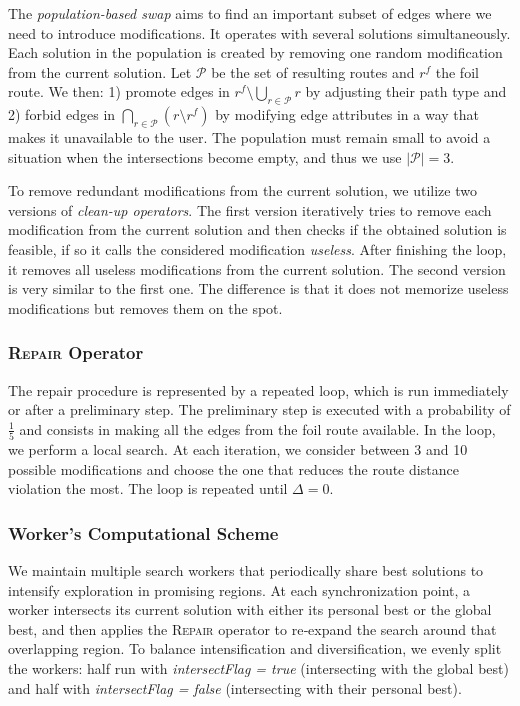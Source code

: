 \documentclass{article}
\begin{document}
The \textit{population-based swap} aims to find an important subset of edges where we need to introduce modifications. 
It operates with several solutions simultaneously. 
Each solution in the population is created by removing one random modification from the current solution. 
Let $\mathcal{P}$ be the set of resulting routes and $r^f$ the foil route. 
We then: 1) promote edges in
$
    r^f \setminus \bigcup_{r \in \mathcal{P}} r
$
by adjusting their path type and 2) forbid edges in 
$
    \bigcap_{r \in \mathcal{P}} \left(r \setminus r^f\right)
$
by modifying edge attributes in a way that makes it unavailable to the user. 
The population must remain small to avoid a situation when the intersections become empty, and thus we use $|\mathcal{P}| = 3$.

To remove redundant modifications from the current solution, we utilize two versions of \textit{clean-up operators}. 
The first version iteratively tries to remove each modification from the current solution and then checks if the obtained solution is feasible, if so it calls the considered modification \textit{useless}. 
After finishing the loop, it removes all useless modifications from the current solution. 
The second version is very similar to the first one. 
The difference is that it does not memorize useless modifications but removes them on the spot.

\subsubsection{\textsc{Repair} Operator}

The repair procedure is represented by a repeated loop, which is run immediately or after a preliminary step. 
The preliminary step is executed with a probability of $\frac{1}{5}$ and consists in making all the edges from the foil route available.
In the loop, we perform a local search. 
At each iteration, we consider between 3 and 10 possible modifications and choose the one that reduces the route distance violation the most.
The loop is repeated until $\Delta=0$.

\subsubsection{Worker's Computational Scheme}

We maintain multiple search workers that periodically share best solutions to intensify exploration in promising regions. 
At each synchronization point, a worker intersects its current solution with either its personal best or the global best, and then applies the \textsc{Repair} operator to re‑expand the search around that overlapping region. 
To balance intensification and diversification, we evenly split the workers: half run with \textit{intersectFlag = true} (intersecting with the global best) and half with \textit{intersectFlag = false} (intersecting with their personal best).
\end{document}
